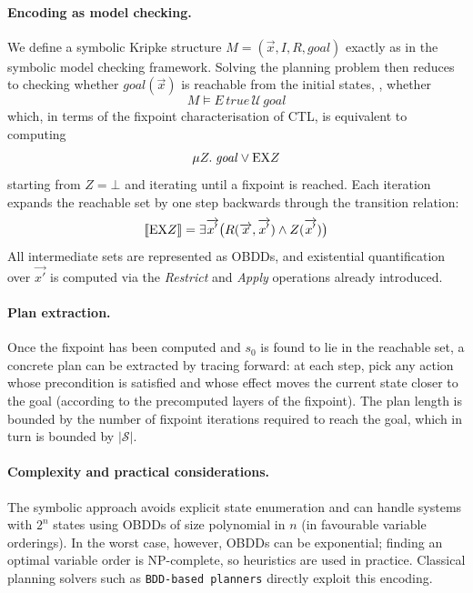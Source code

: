 \documentclass[oneside]{academica}
\begin{document}
\paragraph{Encoding as model checking.}
We define a symbolic Kripke structure $M = (\overrightarrow{x}, I, R, \mathit{goal})$ exactly as in the symbolic model checking framework.
Solving the planning problem then reduces to checking whether $\mathit{goal}(\overrightarrow{x})$ is reachable from the initial states, \ie, whether
\begin{equation*}
  M \models E\,\mathit{true}\,\mathcal{U}\,\mathit{goal}
\end{equation*}
which, in terms of the fixpoint characterisation of CTL, is equivalent to computing
\begin{equation*}
  \mu Z.\; \mathit{goal} \lor \mathrm{EX} Z
\end{equation*}
starting from $Z = \bot$ and iterating until a fixpoint is reached.
Each iteration expands the reachable set by one step backwards through the transition relation:
\begin{equation*}
  \llbracket \mathrm{EX} Z \rrbracket = \exists \overrightarrow{x'} \bigl( R(\overrightarrow{x}, \overrightarrow{x'}) \land Z(\overrightarrow{x'}) \bigr)
\end{equation*}
All intermediate sets are represented as OBDDs, and existential quantification over $\overrightarrow{x'}$ is computed via the \textit{Restrict} and \textit{Apply} operations already introduced.

\paragraph{Plan extraction.}
Once the fixpoint has been computed and $s_0$ is found to lie in the reachable set, a concrete plan can be extracted by tracing forward: at each step, pick any action whose precondition is satisfied and whose effect moves the current state closer to the goal (according to the precomputed layers of the fixpoint). The plan length is bounded by the number of fixpoint iterations required to reach the goal, which in turn is bounded by $|\mathcal{S}|$.

\paragraph{Complexity and practical considerations.}
The symbolic approach avoids explicit state enumeration and can handle systems with $2^n$ states using OBDDs of size polynomial in $n$ (in favourable variable orderings). In the worst case, however, OBDDs can be exponential; finding an optimal variable order is NP-complete, so heuristics are used in practice. Classical planning solvers such as \texttt{BDD-based planners} directly exploit this encoding.
\end{document}
